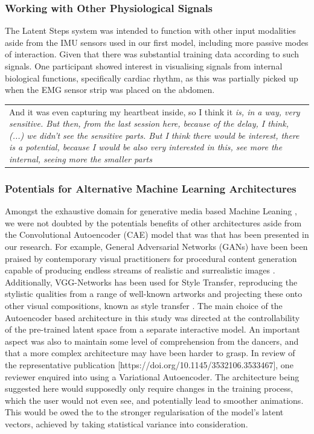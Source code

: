 \subsubsection{Working with Other Physiological Signals}

The Latent Steps system was intended to function with other input modalities aside from the IMU sensors used in our first model, including more passive modes of interaction. Given that there was substantial training data according to such signals. One participant showed interest in visualising signals from internal biological functions, specifically cardiac rhythm, as this was partially picked up when the EMG sensor strip was placed on the abdomen.

\begin{center}
\begin{tabular}{ p{13cm}}
And it was even capturing my heartbeat inside, so I think it \textit{is, in a way, very sensitive. But then, from the last session here, because of the delay, I think, (...) we didn't see the sensitive parts. But I think there would be interest, there is a potential, because I would be also very interested in this, see more the internal, seeing more the smaller parts}
\end{tabular}
\end{center}

\subsubsection{Potentials for Alternative Machine Learning Architectures}

Amongst the exhaustive domain for generative media based Machine Leaning \cite{hertzmann_aesthetics_2019}, we were not doubted by the potentials benefits of other architectures aside from the Convolutional Autoencoder (CAE) model that was that has been presented in our research. For example, General Adversarial Networks (GANs) have been been praised by contemporary visual practitioners for procedural content generation capable of producing endless streams of realistic and surrealistic images \cite{karras_style-based_2019,Elgammal2017CANCA}. Additionally, VGG-Networks has been used for Style Transfer, reproducing the stylistic qualities from a range of well-known artworks and projecting these onto other visual compositions, known as style transfer \cite{gatys_neural_2015}. The main choice of the Autoencoder based architecture in this study was directed at the controllability of the pre-trained latent space from a separate interactive model. An important aspect was also to maintain some level of comprehension from the dancers, and that a more complex architecture may have been harder to grasp.
In review of the representative publication [https://doi.org/10.1145/3532106.3533467], one reviewer enquired into using a Variational Autoencoder. The architecture being suggested here would supposedly only require changes in the training process, which the user would not even see, and potentially lead to smoother animations. This would be owed the to the stronger regularisation of the model's latent vectors, achieved by taking statistical variance into consideration.

